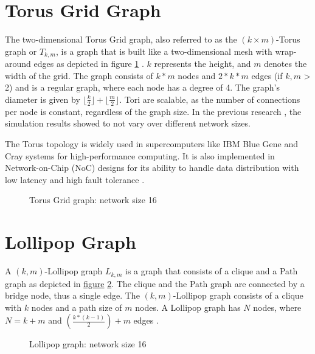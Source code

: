 \section{Torus Grid Graph}\label{sec:2torusgridgraph}
The two-dimensional Torus Grid graph, also referred to as the $(k \times m)$-Torus graph or $T_{k,m}$, is a graph that is built like a two-dimensional mesh with wrap-around edges as depicted in figure \ref{fig:torusGraph} \cite{Mahlmann2010}. $k$ represents the height, and $m$ denotes the width of the grid. The graph consists of $k * m$ nodes and $2* k * m$ edges (if $k, m$ > 2) and is a regular graph, where each node has a degree of 4. The graph's diameter is given by $\lfloor\frac{k}{2}\rfloor + \lfloor\frac{m}{2}\rfloor$. Tori are scalable, as the number of connections per node is constant, regardless of the graph size. In the previous research \cite{Bayazitoglu}, the simulation results showed to not vary over different network sizes.

The Torus topology is widely used in supercomputers like IBM Blue Gene and Cray systems for high-performance computing. It is also implemented in Network-on-Chip (NoC) designs for its ability to handle data distribution with low latency and high fault tolerance \cite{Banerjee2001}.

\begin{figure}[H]
    \centering
    \scalebox{1.5}{}
    \caption{Torus Grid graph: network size 16}
    \label{fig:torusGraph}
\end{figure}

\section{Lollipop Graph}\label{sec:2lollipopgraph}
A $(k, m)$-Lollipop graph $L_{k,m}$ is a graph that consists of a clique and a Path graph as depicted in \hyperref[fig:lollipopgraphDemo]{figure} \ref{fig:lollipopgraphDemo}. The clique and the Path graph are connected by a bridge node, thus a single edge. The $(k, m)$-Lollipop graph consists of a clique with $k$ nodes and a path size of $m$ nodes. A Lollipop graph has $N$ nodes, where $N = k+m$ and $(\frac{k*(k-1)}{2})+m$ edges \cite{JonassonLollipopGraphs2000}.

\begin{figure}[H]
    \centering
    \scalebox{1}{}
    \caption{Lollipop graph: network size 16}
    \label{fig:lollipopgraphDemo}
\end{figure}

